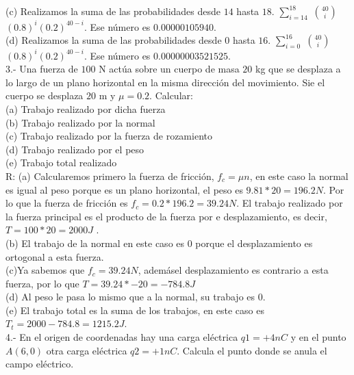 \documentclass{article}
\begin{document}
(c) Realizamos la suma de las probabilidades desde $14$ hasta $18$. $ \sum\limits_{i=14}^{18}$ ${40}\choose{i}$$(0.8)^{i}(0.2)^{40-i}$. Ese número es $ 0.00000105940 
$.\\

(d) Realizamos la suma de las probabilidades desde $0$ hasta $16$. $ \sum\limits_{i=0}^{16}$ ${40}\choose{i}$$(0.8)^{i}(0.2)^{40-i}$. Ese número es $0.00000003521525$.\\

3.- Una fuerza de $100$ N actúa sobre un cuerpo de masa $20$ kg que se desplaza a lo largo de un plano horizontal en la misma dirección del movimiento. Sie el cuerpo se desplaza $20$ m y $\mu = 0.2$. Calcular:\\
(a) Trabajo realizado por dicha fuerza\\
(b) Trabajo realizado por la normal\\
(c) Trabajo realizado por la fuerza de rozamiento\\
(d) Trabajo realizado por el peso\\
(e) Trabajo total realizado\\

R: (a) Calcularemos primero la fuerza de fricción, $f_{c} = \mu n$, en este caso la normal es igual al peso porque es un plano horizontal, el peso es $9.81*20 = 196.2 N$. Por lo que la fuerza de fricción es $f_{c} = 0.2*196.2 = 39.24 N$. El trabajo realizado por la fuerza principal es el producto de la fuerza por e desplazamiento, es decir, $T = 100*20=2000 J$ .\\

(b) El trabajo de la normal en este caso es $0$ porque el desplazamiento es ortogonal a esta fuerza.\\

(c)Ya sabemos que $f_{c} = 39.24 N$, ademásel desplazamiento es contrario a esta fuerza, por lo que $T = 39.24*-20 = -784.8 J$\\

(d) Al peso le pasa lo mismo que a la normal, su trabajo es $0$.\\

(e) El trabajo total es la suma de los trabajos, en este caso es $T_{t} = 2000 - 784.8 = 1215.2 J$.\\

4.- En el origen de coordenadas hay una carga eléctrica $q1 = +4 nC$ y en el punto $A(6,0)$ otra carga eléctrica $q2 = +1 nC$. Calcula el punto donde se anula el campo eléctrico.\\
\end{document}
